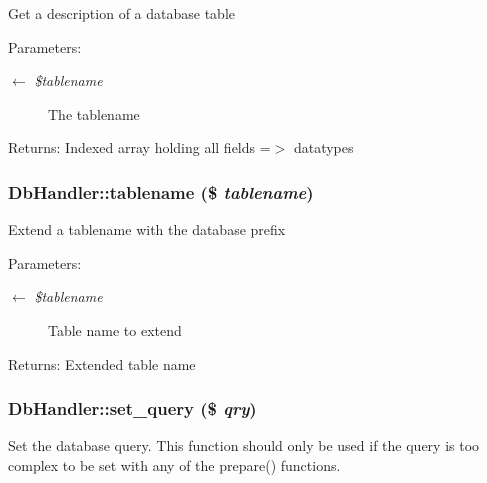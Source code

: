 Get a description of a database table

\begin{Desc}
\item[Parameters:]
\begin{description}
\item[\mbox{$\leftarrow$} {\em \$tablename}]The tablename \end{description}
\end{Desc}
\begin{Desc}
\item[Returns:]Indexed array holding all fields =$>$ datatypes \end{Desc}
\hypertarget{classDbHandler_baca15a312800e5522b3efd9dff036f5}{
\subsubsection{\setlength{\rightskip}{0pt plus 5cm}DbHandler::tablename (\$ {\em tablename})}}
\label{classDbHandler_baca15a312800e5522b3efd9dff036f5}


Extend a tablename with the database prefix

\begin{Desc}
\item[Parameters:]
\begin{description}
\item[\mbox{$\leftarrow$} {\em \$tablename}]Table name to extend \end{description}
\end{Desc}
\begin{Desc}
\item[Returns:]Extended table name \end{Desc}
\hypertarget{classDbHandler_305a3225c4760a88a06b0d55d0893962}{
\subsubsection{\setlength{\rightskip}{0pt plus 5cm}DbHandler::set\_\-query (\$ {\em qry})}}
\label{classDbHandler_305a3225c4760a88a06b0d55d0893962}


Set the database query. This function should only be used if the query is too complex to be set with any of the prepare() functions.

